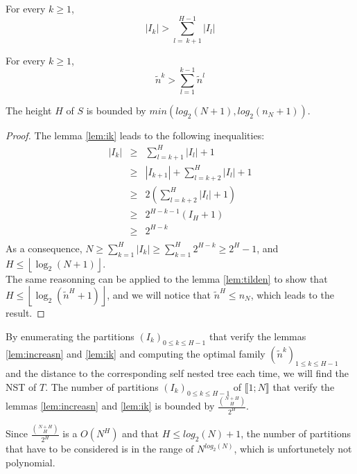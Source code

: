 \begin{lem}
  \label{lem:ik}
  For every $k \geqslant 1$,
  $$|I_{k}| > \sum_{l = \ k+1}^{H-1} |I_{l}|$$
\end{lem}

\begin{lem}
  \label{lem:tilden}
  For every $k \geqslant 1$,
  $$\tilde{n}^{k} > \sum_{l = 1}^{k-1} \tilde{n}^{l}$$
\end{lem}
 
\begin{cor}
  The height $H$ of $S$ is bounded by $min(log_{2}(N+1),
  log_{2}(n_{N}+1))$.
  \begin{proof}
    The lemma \ref{lem:ik} leads to the following inequalities: 
    $$
    \begin{array}{rcl}
      |I_{k}| &\geqslant& \sum_{l=k+1}^{H} |I_{l}| + 1\\
              &\geqslant& |I_{k+1}| + \sum_{l=k+2}^{H} |I_{l}| + 1 \\
              &\geqslant& 2(\sum_{l=k+2}^{H} |I_{l}| + 1) \\
              &\geqslant& 2^{H-k-1}(I_{H} +1)\\
              &\geqslant& 2^{H-k}\\
    \end{array}
    $$
    As a consequence,
    $N \geqslant \sum_{k=1}^{H} |I_{k}| \geqslant \sum_{k=1}^{H}
    2^{H-k} \geqslant 2^{H} -1$,
    and $H \leqslant \left\lfloor \log_{2}(N+1) \right\rfloor$.\\
    The same reasonning can be applied to the lemma \ref{lem:tilden}
    to show that $H \leqslant \left\lfloor \log_{2}(\tilde{n}^{H}+1)
    \right\rfloor$, and we will notice that $\tilde{n}^{H} \leqslant
    n_{N}$, which leads to the result.
  \end{proof}
\end{cor}

By enumerating the partitions $(I_{k})_{0 \leqslant k \leqslant H-1}$
that verify the lemmas \ref{lem:increasn} and \ref{lem:ik} and
computing the optimal family
$(\tilde{n}^{k})_{1 \leqslant k \leqslant H-1}$ and the distance to
the corresponding self nested tree each time, we will find the NST of
$T$. The number of partitions $(I_{k})_{0 \leqslant k \leqslant H-1}$
of $\llbracket 1;N \rrbracket$ that verify the lemmas
\ref{lem:increasn} and \ref{lem:ik} is bounded by
$\frac{\binom{N+H}{H}}{2^H}$. 

Since $\frac{\binom{N+H}{H}}{2^H}$ is a $O(N^H)$ and that $H \leqslant
log_{2}(N)+1$, the number of partitions that have to be considered is
in the range of $N^{log_{2}(N)}$, which is unfortunetely not
polynomial.

